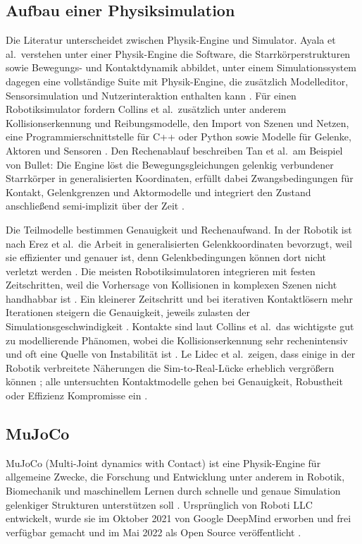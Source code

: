 \subsection{Aufbau einer Physiksimulation}
\label{sec:sim_aufbau}
Die Literatur unterscheidet zwischen Physik-Engine und Simulator.
Ayala et al.\ verstehen unter einer Physik-Engine die Software, die Starrkörperstrukturen sowie Bewegungs- und Kontaktdynamik abbildet, unter einem Simulationssystem dagegen eine vollständige Suite mit Physik-Engine, die zusätzlich Modelleditor, Sensorsimulation und Nutzerinteraktion enthalten kann \cite{Ayala2020}.
Für einen Robotiksimulator fordern Collins et al.\ zusätzlich unter anderem Kollisionserkennung und Reibungsmodelle, den Import von Szenen und Netzen, eine Programmierschnittstelle für C++ oder Python sowie Modelle für Gelenke, Aktoren und Sensoren \cite{Collins2021}.
Den Rechenablauf beschreiben Tan et al.\ am Beispiel von Bullet: Die Engine löst die Bewegungsgleichungen gelenkig verbundener Starrkörper in generalisierten Koordinaten, erfüllt dabei Zwangsbedingungen für Kontakt, Gelenkgrenzen und Aktormodelle und integriert den Zustand anschließend semi-implizit über der Zeit \cite{Tan2018}.

Die Teilmodelle bestimmen Genauigkeit und Rechenaufwand.
In der Robotik ist nach Erez et al.\ die Arbeit in generalisierten Gelenkkoordinaten bevorzugt, weil sie effizienter und genauer ist, denn Gelenkbedingungen können dort nicht verletzt werden \cite{Erez2015}.
Die meisten Robotiksimulatoren integrieren mit festen Zeitschritten, weil die Vorhersage von Kollisionen in komplexen Szenen nicht handhabbar ist \cite{LeLidec2024}.
Ein kleinerer Zeitschritt und bei iterativen Kontaktlösern mehr Iterationen steigern die Genauigkeit, jeweils zulasten der Simulationsgeschwindigkeit \cite{Erez2015}.
Kontakte sind laut Collins et al.\ das wichtigste gut zu modellierende Phänomen, wobei die Kollisionserkennung sehr rechenintensiv und oft eine Quelle von Instabilität ist \cite{Collins2021}.
Le Lidec et al.\ zeigen, dass einige in der Robotik verbreitete Näherungen die Sim-to-Real-Lücke erheblich vergrößern können \cite{LeLidec2024}; alle untersuchten Kontaktmodelle gehen bei Genauigkeit, Robustheit oder Effizienz Kompromisse ein \cite{LeLidec2024}.

\subsection{MuJoCo}
\label{sec:mujoco}
MuJoCo (Multi-Joint dynamics with Contact) ist eine Physik-Engine für allgemeine Zwecke, die Forschung und Entwicklung unter anderem in Robotik, Biomechanik und maschinellem Lernen durch schnelle und genaue Simulation gelenkiger Strukturen unterstützen soll \cite{MujocoDoku2026a}.
Ursprünglich von Roboti LLC entwickelt, wurde sie im Oktober 2021 von Google DeepMind erworben und frei verfügbar gemacht und im Mai 2022 als Open Source veröffentlicht \cite{MujocoDoku2026a}.

